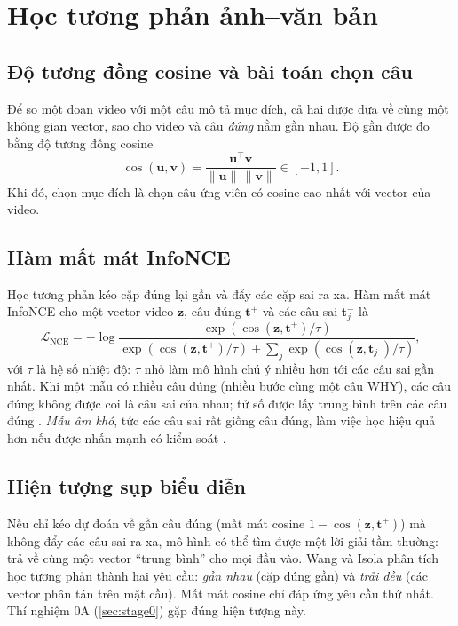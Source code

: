 \documentclass[a4paper,oneside]{report}
\begin{document}
\section{Học tương phản ảnh--văn bản}
\label{sec:contrastive}

\subsection{Độ tương đồng cosine và bài toán chọn câu}

Để so một đoạn video với một câu mô tả mục đích, cả hai được đưa về cùng một không gian vector, sao cho video và câu \textit{đúng} nằm gần nhau. Độ gần được đo bằng độ tương đồng cosine
\begin{equation}
  \cos(\mathbf{u},\mathbf{v}) = \frac{\mathbf{u}^\top\mathbf{v}}{\lVert\mathbf{u}\rVert\,\lVert\mathbf{v}\rVert} \in [-1,1].
\end{equation}
Khi đó, chọn mục đích là chọn câu ứng viên có cosine cao nhất với vector của video.

\subsection{Hàm mất mát InfoNCE}

Học tương phản kéo cặp đúng lại gần và đẩy các cặp sai ra xa. Hàm mất mát InfoNCE \citep{oord2018cpc} cho một vector video $\mathbf{z}$, câu đúng $\mathbf{t}^+$ và các câu sai $\mathbf{t}^-_j$ là
\begin{equation}
  \mathcal{L}_{\mathrm{NCE}} = -\log\frac{\exp(\cos(\mathbf{z},\mathbf{t}^+)/\tau)}{\exp(\cos(\mathbf{z},\mathbf{t}^+)/\tau)+\sum_j \exp(\cos(\mathbf{z},\mathbf{t}^-_j)/\tau)},
  \label{eq:infonce}
\end{equation}
với $\tau$ là hệ số nhiệt độ: $\tau$ nhỏ làm mô hình chú ý nhiều hơn tới các câu sai gần nhất. Khi một mẫu có nhiều câu đúng (nhiều bước cùng một câu WHY), các câu đúng không được coi là câu sai của nhau; tử số được lấy trung bình trên các câu đúng \citep{khosla2020supcon}. \textit{Mẫu âm khó}, tức các câu sai rất giống câu đúng, làm việc học hiệu quả hơn nếu được nhấn mạnh có kiểm soát \citep{robinson2021hard}.

\subsection{Hiện tượng sụp biểu diễn}

Nếu chỉ kéo dự đoán về gần câu đúng (mất mát cosine $1-\cos(\mathbf{z},\mathbf{t}^+)$) mà không đẩy các câu sai ra xa, mô hình có thể tìm được một lời giải tầm thường: trả về cùng một vector ``trung bình'' cho mọi đầu vào. Wang và Isola \citep{wang2020uniformity} phân tích học tương phản thành hai yêu cầu: \textit{gần nhau} (cặp đúng gần) và \textit{trải đều} (các vector phân tán trên mặt cầu). Mất mát cosine chỉ đáp ứng yêu cầu thứ nhất. Thí nghiệm 0A (\cref{sec:stage0}) gặp đúng hiện tượng này.
\end{document}
